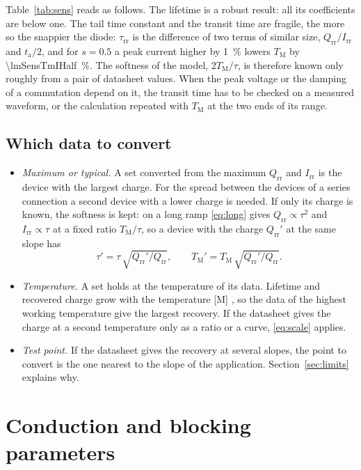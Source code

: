 \documentclass[10pt,a4paper]{scrartcl}
\newcommand{\Irr}{I_\mathrm{rr}}
\newcommand{\Qrr}{Q_\mathrm{rr}}
\newcommand{\ta}{t_\mathrm{a}}
\newcommand{\taurr}{\tau_\mathrm{rr}}
\newcommand{\TM}{T_\mathrm{M}}
\begin{document}
Table~\ref{tab:sens} reads as follows. The lifetime is a robust result: all its coefficients are below one. The tail time constant and the transit time are fragile, the more so the snappier the diode: $\taurr$ is the difference of two terms of similar size, $\Qrr/\Irr$ and $\ta/2$, and for $s = 0.5$ a peak current higher by \SI{1}{\percent} lowers $\TM$ by \SI{\lmSensTmIHalf}{\percent}. The softness of the model, $2\TM/\tau$, is therefore known only roughly from a pair of datasheet values. When the peak voltage or the damping of a commutation depend on it, the transit time has to be checked on a measured waveform, or the calculation repeated with $\TM$ at the two ends of its range.

\subsection{Which data to convert}
\label{sec:which}
\begin{itemize}
\item \emph{Maximum or typical.} A set converted from the maximum $\Qrr$ and $\Irr$ is the device with the largest charge. For the spread between the devices of a series connection a second device with a lower charge is needed. If only its charge is known, the softness is kept: on a long ramp \eqref{eq:long} gives $\Qrr \propto \tau^2$ and $\Irr \propto \tau$ at a fixed ratio $\TM/\tau$, so a device with the charge $\Qrr'$ at the same slope has
\begin{equation}
\tau' = \tau\,\sqrt{\Qrr'/\Qrr} , \qquad \TM' = \TM\,\sqrt{\Qrr'/\Qrr} .
\label{eq:scale}
\end{equation}
\item \emph{Temperature.} A set holds at the temperature of its data. Lifetime and recovered charge grow with the temperature [M] \cite{lutz}, so the data of the highest working temperature give the largest recovery. If the datasheet gives the charge at a second temperature only as a ratio or a curve, \eqref{eq:scale} applies.
\item \emph{Test point.} If the datasheet gives the recovery at several slopes, the point to convert is the one nearest to the slope of the application. Section~\ref{sec:limits} explains why.
\end{itemize}

\section{Conduction and blocking parameters}
\label{sec:static}
\end{document}

